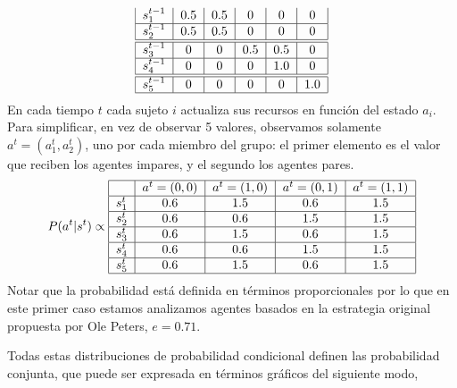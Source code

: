 \documentclass[a4paper,10pt]{article}
\begin{document}
{\begin{align}
\begin{tabular}{|c|c|c|c|c|c|}
       $s^{t-1}_1$ & $0.5$ & $0.5$ & $0$ &  $0$ & $0$  \\ \hline
       $s^{t-1}_2$ & $0.5$ & $0.5$ & $0$ & $0$ & $0$  \\ \hline \hline
       $s^{t-1}_3$ & $0$ & $0$ & $0.5$ & $0.5$ & $0$  \\ \hline
       $s^{t-1}_4$ & $0$ & $0$ & $0$ & $1.0$ & $0$  \\ \hline \hline
       $s^{t-1}_5$ & $0$ & $0$ & $0$ & $0$ & $1.0$  \\ \hline
\end{tabular}
\end{align}
%
En cada tiempo $t$ cada sujeto $i$ actualiza sus recursos en función del estado $a_i$.
Para simplificar, en vez de observar 5 valores, observamos solamente $a^t=(a^t_1, a^t_2)$, uno por cada miembro del grupo: el primer elemento es el valor que reciben los agentes impares, y el segundo los agentes pares. 
%
\begin{align}
\centering
P(a^{t}|s^{t}) \propto \begin{tabular}{|c|c|c|c|c|c|c|}
        \hline
        & $a^t=(0,0)$ & $a^t=(1,0)$ & $a^t=(0,1)$ &  $a^t=(1,1)$  \\ \hline
       $s^{t}_1$ & $0.6$ & $1.5$ & $0.6$ & $1.5$ \\ \hline
       $s^{t}_2$ & $0.6$ & $0.6$ & $1.5$ & $1.5$  \\ \hline
       $s^{t}_3$ & $0.6$ & $1.5$ & $0.6$ & $1.5$  \\ \hline
       $s^{t}_4$ & $0.6$ & $0.6$ & $1.5$ & $1.5$ \\ \hline
       $s^{t}_5$ & $0.6$ & $1.5$ & $0.6$ & $1.5$ \\ \hline
\end{tabular}
\end{align}
Notar que la probabilidad está definida en términos proporcionales por lo que en este primer caso estamos analizamos agentes basados en la estrategia original propuesta por Ole Peters, $e=0.71$.


Todas estas distribuciones de probabilidad condicional definen las probabilidad conjunta, que puede ser expresada en términos gráficos del siguiente modo,
%
\begin{figure}[H]
\centering
{}
\end{figure}}
\end{document}
